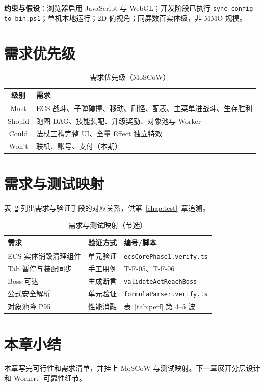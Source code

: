 \textbf{约束与假设}：浏览器启用 JavaScript 与 WebGL；开发阶段已执行 \texttt{sync-config-to-bin.ps1}；单机本地运行；2D 俯视角；同屏数百实体级，非 MMO 规模。

\section{需求优先级}

\begin{table}[htbp]
  \centering
  \caption{需求优先级（MoSCoW）}
  \label{tab:moscow}
  \begin{tabular}{cl}
    \toprule
    \textbf{级别} & \textbf{需求} \\
    \midrule
    Must & ECS 战斗、子弹碰撞、移动、刷怪、配表、主菜单进战斗、生存胜利 \\
    Should & 跑图 DAG、技能装配、升级奖励、对象池与 Worker \\
    Could & 法杖三槽完整 UI、全量 Effect 独立特效 \\
    Won't & 联机、账号、支付（本期） \\
    \bottomrule
  \end{tabular}
\end{table}

\section{需求与测试映射}

表~\ref{tab:req-test-map} 列出需求与验证手段的对应关系，供第~\ref{chap:test}~章追溯\cite{petty2010vv}。

\begin{table}[htbp]
  \centering
  \caption{需求与测试映射（节选）}
  \label{tab:req-test-map}
  \begin{tabular}{p{2.8cm}p{5.5cm}p{4.7cm}}
    \toprule
    \textbf{需求} & \textbf{验证方式} & \textbf{编号/脚本} \\
    \midrule
    ECS 实体销毁清理组件 & 单元验证 & \texttt{ecsCorePhase1.verify.ts} \\
    Tab 暂停与装配同步 & 手工用例 & T-F-05、T-F-06 \\
    Boss 可达 & 生成断言 & \texttt{validateActReachBoss} \\
    公式安全解析 & 单元验证 & \texttt{formulaParser.verify.ts} \\
    对象池降 P95 & 性能消融 & 表~\ref{tab:perf} 第 4--5 波 \\
    \bottomrule
  \end{tabular}
\end{table}

\section{本章小结}

本章写完可行性和需求清单，并挂上 MoSCoW 与测试映射。下一章展开分层设计和 Worker、可靠性细节。
